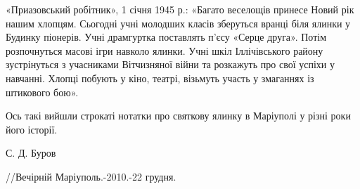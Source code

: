 «Приазовський робітник», 1 січня 1945 р.: «Багато веселощів принесе Новий рік
нашим хлопцям. Сьогодні учні молодших класів зберуться вранці біля ялинки у
Будинку піонерів. Учні драмгуртка поставлять п'єсу «Серце друга». Потім
розпочнуться масові ігри навколо ялинки. Учні шкіл Іллічівського району
зустрінуться з учасниками Вітчизняної війни та розкажуть про свої успіхи у
навчанні. Хлопці побують у кіно, театрі, візьмуть участь у змаганнях із
штикового бою».

Ось такі вийшли строкаті нотатки про святкову ялинку в Маріуполі у різні роки
його історії.

С. Д. Буров

//Вечірній Маріуполь.-2010.-22 грудня.
